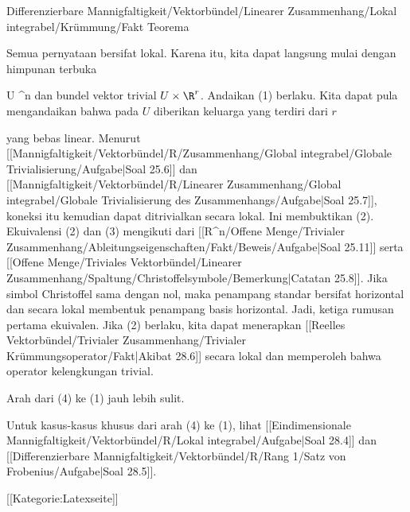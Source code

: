 {Differenzierbare Mannigfaltigkeit/Vektorbündel/Linearer Zusammenhang/Lokal integrabel/Krümmung/Fakt}
{Teorema}
{}
{

\faktzusatz {}
\faktzusatz {}

}
{

Semua pernyataan bersifat lokal. Karena itu, kita dapat langsung mulai dengan himpunan terbuka

\mavergleichskette
{\vergleichskette
{ U
}
{ \subseteq }{ \R^n
}
{  }{
}
{    }{
}
{   }{
}
}
{}{}{}
dan bundel vektor trivial $U \times \R^r$. Andaikan (1) berlaku. Kita dapat pula mengandaikan bahwa pada $U$ diberikan keluarga yang terdiri dari $r$

 yang bebas linear. Menurut
[[Mannigfaltigkeit/Vektorbündel/R/Zusammenhang/Global integrabel/Globale Trivialisierung/Aufgabe|Soal 25.6]]
dan
[[Mannigfaltigkeit/Vektorbündel/R/Linearer Zusammenhang/Global integrabel/Globale Trivialisierung des Zusammenhangs/Aufgabe|Soal 25.7]],
koneksi itu kemudian dapat ditrivialkan secara lokal. Ini membuktikan (2). Ekuivalensi (2) dan (3) mengikuti dari
[[R^n/Offene Menge/Trivialer Zusammenhang/Ableitungseigenschaften/Fakt/Beweis/Aufgabe|Soal 25.11]]
serta
[[Offene Menge/Triviales Vektorbündel/Linearer Zusammenhang/Spaltung/Christoffelsymbole/Bemerkung|Catatan 25.8]].
Jika simbol Christoffel sama dengan nol, maka penampang standar bersifat horizontal dan secara lokal membentuk penampang basis horizontal. Jadi, ketiga rumusan pertama ekuivalen. Jika (2) berlaku, kita dapat menerapkan
[[Reelles Vektorbündel/Trivialer Zusammenhang/Trivialer Krümmungsoperator/Fakt|Akibat 28.6]]
secara lokal dan memperoleh bahwa operator kelengkungan trivial.

Arah dari (4) ke (1) jauh lebih sulit.

}

Untuk kasus-kasus khusus dari arah (4) ke (1), lihat
[[Eindimensionale Mannigfaltigkeit/Vektorbündel/R/Lokal integrabel/Aufgabe|Soal 28.4]]
dan
[[Differenzierbare Mannigfaltigkeit/Vektorbündel/R/Rang 1/Satz von Frobenius/Aufgabe|Soal 28.5]].

 [[Kategorie:Latexseite]]
